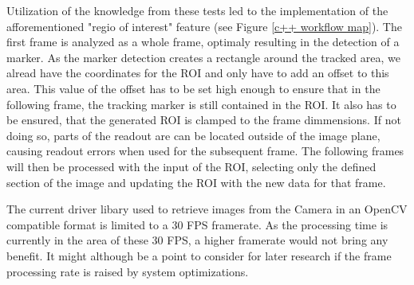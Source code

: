 Utilization of the knowledge from these tests led to the implementation of the afforementioned "regio of interest" feature (see Figure \ref{c++ workflow map}).
The first frame is analyzed as a whole frame, optimaly resulting in the detection of a marker. As the marker detection creates a rectangle around the tracked area, we alread have the coordinates for the ROI and only have to add an offset to this area. This value of the offset has to be set high enough to ensure that in the following frame, the tracking marker is still contained in the ROI. It also has to be ensured, that the generated ROI is clamped to the frame dimmensions. If not doing so, parts of the readout are can be located outside of the image plane, causing readout errors when used for the subsequent frame. The following frames will then be processed with the input of the ROI, selecting only the defined section of the image and updating the ROI with the new data for that frame.

The current driver libary used to retrieve images from the Camera in an OpenCV compatible format is limited to a 30 FPS framerate. As the processing time is currently in the area of these 30 FPS, a higher framerate would not bring any benefit. It might although be a point to consider for later research if the frame processing rate is raised by system optimizations. 

